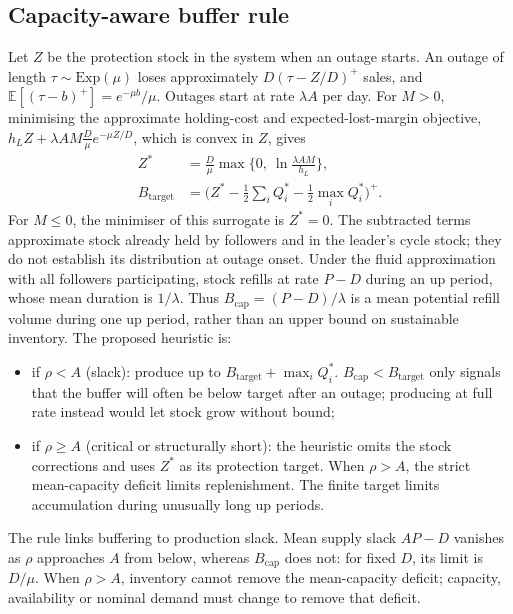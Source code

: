 \documentclass{ifacconf}
\newcommand{\rev}[1]{#1}
\newcommand{\E}{\mathbb{E}}
\begin{document}
\subsection{Capacity-aware buffer rule}\label{sec:buffer}
Let $Z$ be the protection stock in the system when an outage starts. An outage of length $\tau\sim\text{Exp}(\mu)$ loses approximately $D(\tau-Z/D)^+$ sales, and $\E[(\tau-b)^+]=e^{-\mu b}/\mu$. Outages start at rate $\lambda A$ per day. \rev{For $M>0$, minimising the approximate holding-cost and expected-lost-margin objective,} $h_LZ+\lambda AM\frac{D}{\mu}e^{-\mu Z/D}$, which is convex in $Z$, gives
\begin{equation}\label{eq:Z}
\begin{aligned}
Z^*&=\frac{D}{\mu}\max\Big\{0,\ \ln\frac{\lambda AM}{h_L}\Big\},\\
B_{\text{target}}&=\Big(Z^*-\tfrac12\textstyle\sum_iQ_i^*-\tfrac12\max_iQ_i^*\Big)^{+}.
\end{aligned}
\end{equation}
\rev{For $M\le0$, the minimiser of this surrogate is $Z^*=0$. The subtracted terms approximate stock already held by followers and in the leader's cycle stock; they do not establish its distribution at outage onset.} \rev{Under the fluid approximation with all followers participating, stock refills at rate $P-D$ during an up period, whose mean duration is $1/\lambda$. Thus $B_{\text{cap}}=(P-D)/\lambda$ is a mean potential refill volume during one up period, rather than an upper bound on sustainable inventory.} \rev{The proposed heuristic is:}
\begin{itemize}[leftmargin=*]
\item if $\rho<A$ (slack): produce up to $B_{\text{target}}+\max_iQ_i^*$. $B_{\text{cap}}<B_{\text{target}}$ only signals that the buffer will often be below target after an outage; producing at full rate instead would let stock grow without bound;
\item \rev{if $\rho\ge A$ (critical or structurally short): the heuristic omits the stock corrections and uses $Z^*$ as its protection target. When $\rho>A$, the strict mean-capacity deficit limits replenishment. The finite target limits accumulation during unusually long up periods.}
\end{itemize}
\rev{The rule links buffering to production slack. Mean supply slack $AP-D$ vanishes as $\rho$ approaches $A$ from below, whereas $B_{\text{cap}}$ does not: for fixed $D$, its limit is $D/\mu$. When $\rho>A$, inventory cannot remove the mean-capacity deficit; capacity, availability or nominal demand must change to remove that deficit.}
\end{document}
